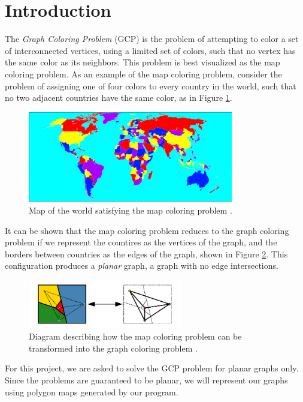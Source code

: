 \documentclass{article}
\begin{document}
\section{Introduction}
	The \textit{Graph Coloring Problem} (GCP) is the problem of attempting to color a set of interconnected vertices, using a limited set of colors, such that no vertex has the same color as its neighbors. This problem is best visualized as the map coloring problem. As an example of the map coloring problem, consider the problem of assigning one of four colors to every country in the world, such that no two adjacent countries have the same color, as in Figure \ref{world}. 
	\begin{figure}[h!]
		\centering
		\includegraphics[width=0.8\textwidth]{images/world_map}
		\caption{Map of the world satisfying the map coloring problem \cite{world}.}
		\label{world}
	\end{figure}
	It can be shown that the map coloring problem reduces to the graph coloring problem\cite{ai} if we represent the countires as the vertices of the graph, and the borders between countries as the edges of the graph, shown in Figure \ref{four_col}. This configuration produces a \textit{planar} graph, a graph with no edge intersections. 	
	\begin{figure}[h!]
		\centering
		\includegraphics[width=0.6\textwidth]{images/four_color}
		\caption{Diagram describing how the map coloring problem can be transformed into the graph coloring problem \cite{four_color}.}
		\label{four_col}
	\end{figure}
	For this project, we are asked to solve the GCP problem for planar graphs only. Since the problems are guaranteed to be planar, we will represent our graphs using polygon maps generated by our program.
	
\end{document}
